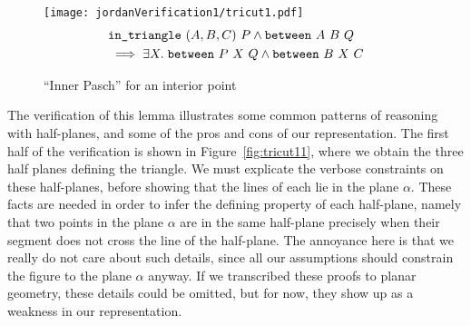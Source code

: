 \begin{figure}
\centering\texttt{[image: jordanVerification1/tricut1.pdf]}
\begin{equation}\label{eq:tricut1}
  \begin{split}
    &\texttt{in\_triangle}\ (A,B,C)\ P \wedge \texttt{between}\ A\ B\ Q \\
    &\implies\exists X.\; \texttt{between}\ P\ X\ Q \wedge \texttt{between}\ B\ X\ C
  \end{split}
\end{equation}
\caption{``Inner Pasch'' for an interior point}
\label{fig:tricut1}
\end{figure}

The verification of this lemma illustrates some common patterns of reasoning with half-planes, and some of the pros and cons of our representation. The first half of the verification is shown in Figure~\ref{fig:tricut11}, where we obtain the three half planes defining the triangle. We must explicate the verbose constraints on these half-planes, before showing that the lines of each lie in the plane $\alpha$. These facts are needed in order to infer the defining property of each half-plane, namely that two points in the plane $\alpha$ are in the same half-plane precisely when their segment does not cross the line of the half-plane. The annoyance here is that we really do not care about such details, since all our assumptions should constrain the figure to the plane $\alpha$ anyway. If we transcribed these proofs to planar geometry, these details could be omitted, but for now, they show up as a weakness in our representation.

